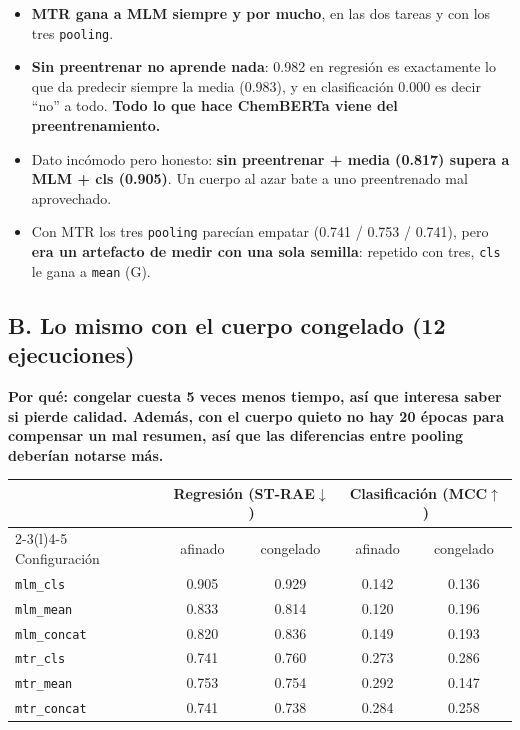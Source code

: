 \documentclass[11pt,a4paper]{article}
\newcommand{\var}[1]{\texttt{#1}}
\newcommand{\exper}[2]{\subsection*{#1}\noindent\textbf{\small\textcolor{dtured}{#2}}\par\smallskip}
\begin{document}
\begin{concl}
\begin{itemize}
  \item \textbf{MTR gana a MLM siempre y por mucho}, en las dos tareas y con los tres \var{pooling}.
  \item \textbf{Sin preentrenar no aprende nada}: 0.982 en regresión es exactamente lo que da
        predecir siempre la media (0.983), y en clasificación 0.000 es decir ``no'' a todo.
        \textbf{Todo lo que hace ChemBERTa viene del preentrenamiento.}
  \item Dato incómodo pero honesto: \textbf{sin preentrenar + media (0.817) supera a MLM + cls
        (0.905)}. Un cuerpo al azar bate a uno preentrenado mal aprovechado.
  \item Con MTR los tres \var{pooling} parecían empatar (0.741 / 0.753 / 0.741), pero
        \textbf{era un artefacto de medir con una sola semilla}: repetido con tres, \var{cls} le gana
        a \var{mean} (G).
\end{itemize}
\end{concl}

\exper{B. Lo mismo con el cuerpo congelado (12 ejecuciones)}
{Por qué: congelar cuesta 5 veces menos tiempo, así que interesa saber si pierde calidad. Además, con el cuerpo quieto no hay 20 épocas para compensar un mal resumen, así que las diferencias entre pooling deberían notarse más.}

\begin{center}
\begin{tabular}{lcc@{\qquad}cc}
\toprule
& \multicolumn{2}{c}{Regresión (ST-RAE$\downarrow$)} & \multicolumn{2}{c}{Clasificación (MCC$\uparrow$)} \\
\cmidrule(r){2-3}\cmidrule(l){4-5}
Configuración & afinado & congelado & afinado & congelado \\ \midrule
\var{mlm\_cls}    & 0.905 & 0.929 & 0.142 & 0.136 \\
\var{mlm\_mean}   & 0.833 & 0.814 & 0.120 & 0.196 \\
\var{mlm\_concat} & 0.820 & 0.836 & 0.149 & 0.193 \\
\var{mtr\_cls}    & 0.741 & 0.760 & 0.273 & 0.286 \\
\var{mtr\_mean}   & 0.753 & 0.754 & 0.292 & 0.147 \\
\var{mtr\_concat} & 0.741 & 0.738 & 0.284 & 0.258 \\
\bottomrule
\end{tabular}
\end{center}
\end{document}
